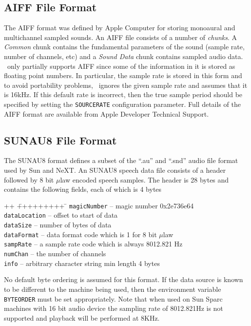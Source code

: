 \subsection{AIFF File Format}

The AIFF format was defined by Apple Computer for storing monoaural and
multichannel sampled sounds.  An AIFF file consists of a number of {\it
chunks}.  A {\it Common} chunk contains the fundamental parameters of the sound
(sample rate, number of channels, etc) and a {\it Sound Data} chunk contains
sampled audio data.  \HTK\ only partially supports AIFF since some of the
information in it is stored as floating point numbers.  In particular, the
sample rate is stored in this form and to avoid portability problems, 
\HTK\ ignores the given sample rate and assumes that it is 16kHz.  If this 
default rate is incorrect, then the true sample period should be
specified by setting the \texttt{SOURCERATE} configuration parameter.
Full details of the AIFF format are available from Apple Developer
Technical Support.

\subsection{SUNAU8 File Format}

The SUNAU8 format defines a subset of the ``.au'' and ``.snd'' audio file
format used by Sun and NeXT.  An SUNAU8 speech data file consists of a header
followed by 8 bit $\mu$law encoded speech samples.  The header is 28 bytes and
contains the following fields, each of which is 4 bytes
\begin{tabbing}
++ \= +++++++++ \= \kill
\>\texttt{magicNumber}  \>-- magic number 0x2e736e64 \\
\>\texttt{dataLocation} \>-- offset to start of data \\
\>\texttt{dataSize} \>-- number of bytes of data \\
\>\texttt{dataFormat} \>-- data format code which is 1 for 8 bit $\mu$law \\ 
\>\texttt{sampRate} \>-- a sample rate code which is always 8012.821 Hz \\ 
\>\texttt{numChan} \>-- the number of channels \\ 
\>\texttt{info} \>-- arbitrary character string min length 4 bytes
\end{tabbing}
No default byte ordering is assumed for this format. If the data source is
known to be different to the machine being used, then the environment variable
\texttt{BYTEORDER} must be set appropriately. Note that when used on Sun Sparc
machines with 16 bit audio device the sampling rate of 8012.821Hz is not
supported and playback will be performed at 8KHz.


